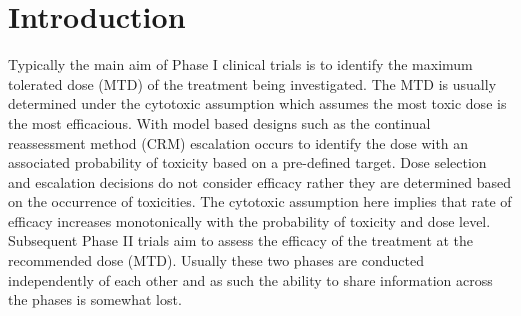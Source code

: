 



\section{Introduction}
\label{WT:Introduction}

Typically the main aim of Phase \RN{1} clinical trials is to identify the maximum tolerated dose (MTD) of the treatment being investigated. The MTD is usually determined under the cytotoxic assumption which assumes the most toxic dose is the most efficacious. With model based designs such as the continual reassessment method (CRM) \cite{oquigleyContinualReassessmentMethod1990} escalation occurs to identify the dose with an associated probability of toxicity based on a pre-defined target. Dose selection and escalation decisions do not consider efficacy rather they are determined based on the occurrence of toxicities. The cytotoxic assumption here implies that rate of efficacy increases monotonically with the probability of toxicity and dose level. Subsequent Phase \RN{2} trials aim to assess the efficacy of the treatment at the recommended dose (MTD). Usually these two phases are conducted independently of each other and as such the ability to share information across the phases is somewhat lost. 

